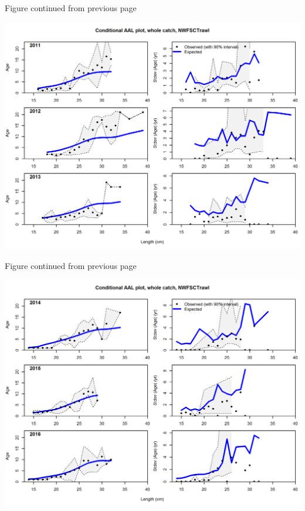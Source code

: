 \documentclass[12pt,]{article}
\begin{document}
\begin{center} 

              Figure continued from previous page 

             \end{center}

\includegraphics{./r4ss/plots_mod1/comp_condAALfit_Andre_plotsflt8mkt0_page3.png}

\begin{center} 

              Figure continued from previous page 

             \end{center}

\includegraphics{./r4ss/plots_mod1/comp_condAALfit_Andre_plotsflt8mkt0_page4.png}
\end{document}
